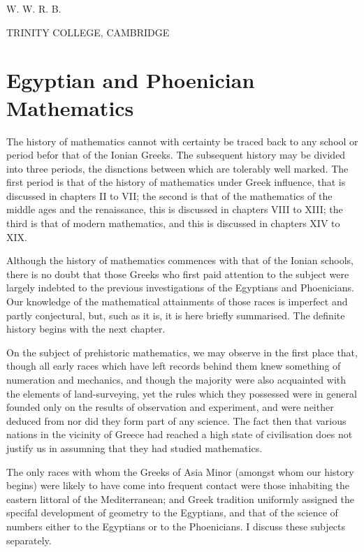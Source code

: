 \documentclass[12pt,oneside]{book}
\begin{document}
\begin{flushright}
    {\Large W. W. R. B.}
\end{flushright}
{\footnotesize TRINITY COLLEGE, CAMBRIDGE}

\tableofcontents

\mainmatter

\chapter{Egyptian and Phoenician Mathematics}

The history of mathematics cannot with certainty be traced back to any school or period befor that of the Ionian Greeks.
The subsequent history may be divided into three periods, the disnctions between which are tolerably well marked.
The first period is that of the history of mathematics under Greek influence, that is discussed in chapters II to VII;
the second is that of the mathematics of the middle ages and the renaissance, this is discussed in chapters VIII to XIII;
the third is that of modern mathematics, and this is discussed in chapters XIV to XIX. 

Although the history of mathematics commences with that of the Ionian schools, there is no doubt that those Greeks who first paid attention 
to the subject were largely indebted to the previous investigations of the Egyptians and Phoenicians. Our knowledge of the mathematical
attainments of those races is imperfect and partly conjectural, but, such as it is, it is here briefly summarised. The definite
history begins with the next chapter.

On the subject of prehistoric mathematics, we may observe in the first place that, though all early races which have left records behind them knew something of numeration
and mechanics, and though the majority were also acquainted with the elements of land-surveying, yet the rules which they possessed were in general founded only on the 
results of observation and experiment, and were neither deduced from nor did they form part of any science. The fact then that various nations in the vicinity of Greece had reached
a high state of civilisation does not justify us in assumning that they had studied mathematics. \par 

The only races with whom the Greeks of Asia Minor (amongst whom our history begins) were likely to have come into frequent contact were those inhabiting the eastern littoral of
the Mediterranean; and Greek tradition uniformly assigned the specifal development of geometry to the Egyptians, and that of the science of numbers either to the 
Egyptians or to the Phoenicians. I discuss these subjects separately. \par 
\end{document}
